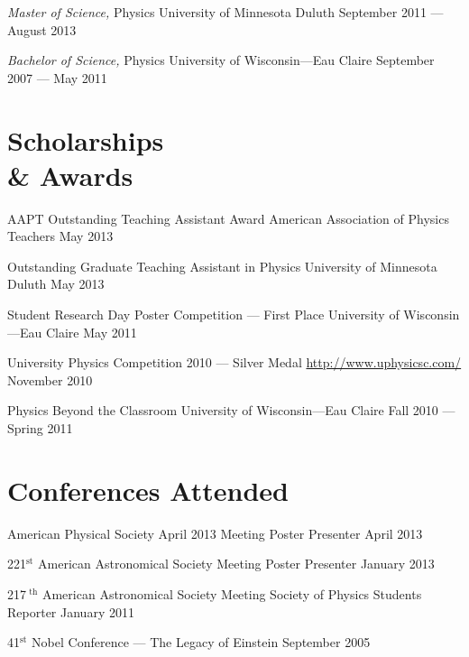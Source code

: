 \documentclass{cv}
\begin{document}
\begin{resume}
\object																		
{\emph{Master of Science,} Physics}											
{\rm University of Minnesota Duluth}											
{September 2011 --- August 2013}	


\object
{\emph{Bachelor of Science,} Physics}											
{\rm University of Wisconsin---Eau Claire}									
{September 2007 --- May 2011}



\section{Scholarships \\ \& Awards}



\object
{AAPT Outstanding Teaching Assistant Award}
{American Association of Physics Teachers}
{May 2013}


\object
{Outstanding Graduate Teaching Assistant in Physics}
{University of Minnesota Duluth}
{May 2013}


\object
{Student Research Day Poster Competition --- First Place}
{University of Wisconsin---Eau Claire}
{May 2011}


\object
{University Physics Competition 2010 --- Silver Medal}
{\rm \href{http://www.uphysicsc.com/}{http://www.uphysicsc.com/} }
{November 2010}


\object
{Physics Beyond the Classroom}
{University of Wisconsin---Eau Claire}
{Fall 2010 --- Spring 2011}



\section{Conferences Attended}



\object
{American Physical Society April 2013 Meeting}
{Poster Presenter}
{April 2013}


\object
{221$^\text{st}$ American Astronomical Society Meeting}
{Poster Presenter}
{January 2013}


\object
{217$^\text{ th}$ American Astronomical Society Meeting}
{Society of Physics Students Reporter}
{January 2011}


\object
{41$^\text{st}$ Nobel Conference --- The Legacy of Einstein}
{}
{September 2005}




\end{resume}
\end{document}
